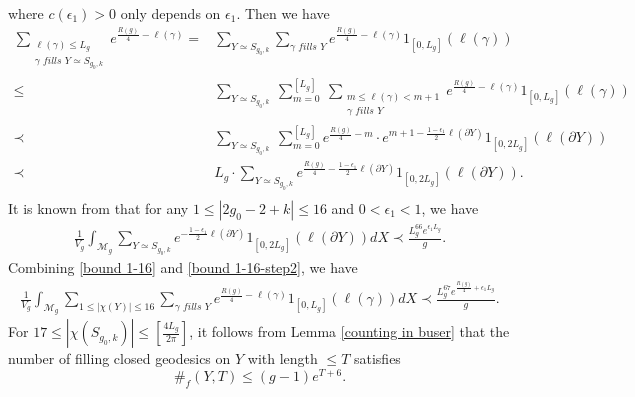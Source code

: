 \documentclass[11pt]{amsart}
\newcommand{\M}{\mathcal{M}}
\newcommand{\eps}{\epsilon}
\theoremstyle{plain}
\theoremstyle{definition}
\theoremstyle{remark}
\begin{document}
 where $c(\epsilon_1)>0$ only depends on $\epsilon_1$.
 Then we have
\begin{equation}\label{bound 1-16}
 \begin{aligned}
  \sum_{\substack{\ell(\gamma)\leq L_g\\
\gamma \textit{ fills }Y\simeq S_{g_0,k}}}e^{\frac{R(g)}{4}-\ell(\gamma)}=&  \sum_{Y\simeq S_{g_0,k}}\sum_{\gamma \textit{ fills } Y}e^{\frac{R(g)}{4}-\ell(\gamma)}1_{[0,L_g]}(\ell(\gamma))\\
   \leq &\sum_{Y\simeq S_{g_0,k}} \ \sum_{m=0}^{[L_g]} \ \sum_{\substack{m\leq \ell(\gamma)<m+1\\
\gamma \textit{ fills }Y}} e^{\frac{R(g)}{4}-\ell(\gamma)}1_{[0,L_g]}(\ell(\gamma))\\
   \prec &\sum_{Y\simeq S_{g_0,k}} \ \sum_{m=0}^{[L_g]}  e^{\frac{R(g)}{4}-m}\cdot e^{m+1-\frac{1-\epsilon_1}{2}\ell(\partial Y)}1_{[0,2L_g]}(\ell(\partial 
 Y))\\
   \prec & L_g\cdot \sum_{Y\simeq S_{g_0,k}}   e^{\frac{R(g)}{4}-\frac{1-\epsilon_1}{2}\ell(\partial Y)}1_{[0,2L_g]}(\ell(\partial 
 Y)).\\
   \end{aligned}
 \end{equation}
It is known from \cite[Proposition 35]{wu2022random} that  for any $1\leq |2g_0-2+k|\leq 16$ and $0<\eps_1<1$, we have
\begin{equation}\label{bound 1-16-step2}
    \begin{aligned}
        \frac{1}{V_g}\int_{\M_g}\sum_{Y\simeq S_{g_0,k}}   e^{-\frac{1-\epsilon_1}{2}\ell(\partial Y)}1_{[0,2L_g]}(\ell(\partial 
 Y))dX\prec \frac{L_g^{66}e^{\eps_1L_g} }{g}.
    \end{aligned}
\end{equation}
Combining \eqref{bound 1-16} and \eqref{bound 1-16-step2}, we have 
\begin{equation}\label{int 1-16}
 \begin{aligned}
 \frac{1}{V_g}\int_{\M_g}\sum_{1\leq |\chi(Y)|\leq 16} \sum_{\gamma \textit{ fills } Y} e^{\frac{R(g)}{4}-\ell(\gamma)}  1_{[0,L_g]}(\ell(\gamma)) dX \prec \frac{L_g^{67}e^{\frac{R(g)}{4}+\epsilon_1L_g}}{g}.
   \end{aligned}
 \end{equation}
For $17\leq |\chi(S_{g_0,k})|\leq [\frac{4L_g}{2\pi}]$, it follows from Lemma \ref{counting in buser} that the number of filling closed geodesics on $Y$ with length $\leq T$ satisfies $$
\#_f(Y,T)\leq (g-1)e^{T+6}.
$$
\end{document}
